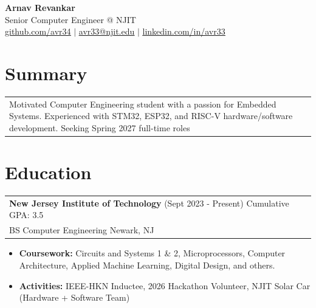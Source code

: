 \documentclass{article}
\newcommand{\underlinedLink}[2]{
    {\underline{\large \href{#1}{#2}}}
}
\begin{document}
\begin{spacing}{1.4}
    \begin{center}
        {\bf\Huge Arnav Revankar} \\
        {\large Senior Computer Engineer @ NJIT} \\
        \underlinedLink{https://github.com/avr34}{github.com/avr34} $|$ \underlinedLink{mailto:avr33@njit.edu}{avr33@njit.edu} $|$ \underlinedLink{https://linkedin.com/in/avr33}{linkedin.com/in/avr33}
    \end{center}
\end{spacing}
\vspace{-9pt}

\section{Summary}
    \begin{center}
        \begin{tabular}{p{}}
            Motivated Computer Engineering student with a passion for Embedded Systems. Experienced with STM32, ESP32, and RISC-V hardware/software development. Seeking Spring 2027 full-time roles \\
        \end{tabular}
    \end{center}

\section{Education}
    \vspace{-5pt}\begin{center}
        \begin{tabular}{p{}}
            {\large \bf New Jersey Institute of Technology} (Sept 2023 - Present) \hfill Cumulative GPA: 3.5 \\
            BS Computer Engineering \hfill Newark, NJ
        \end{tabular}
    \end{center}
    \vspace{-10pt}\begin{itemize}
        \item {\bf Coursework:} Circuits and Systems 1 \& 2, Microprocessors, Computer Architecture, Applied Machine Learning, Digital Design, and others.
		\item {\bf Activities:} IEEE-HKN Inductee, 2026 Hackathon Volunteer, NJIT Solar Car (Hardware + Software Team)
    \end{itemize}
\end{document}
